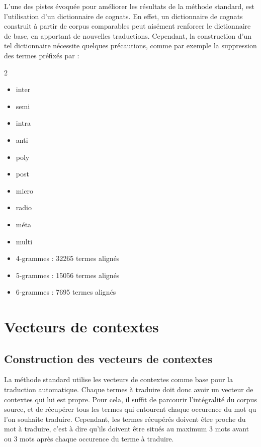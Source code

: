 	L'une des pistes évoquée pour améliorer les résultats de la méthode standard, est l'utilisation d'un dictionnaire de cognats. En effet, un dictionnaire de cognats construit à partir de corpus comparables peut aisément renforcer le dictionnaire de base, en apportant de nouvelles traductions. Cependant, la construction d'un tel dictionnaire nécessite quelques précautions, comme par exemple la suppression des termes préfixés par :
	\begin {multicols}{2}
	\begin{itemize}
		\item inter 
		\item semi 
		\item intra 
		\item anti 
		\item poly 
		\item post 
		\item micro 
		\item radio 
		\item méta 
		\item multi
	\end{itemize}
	\end {multicols}	

	\vspace{0.5cm}
	
	\begin{itemize}
		\item 4-grammes : 32265 termes alignés
		\item 5-grammes : 15056 termes alignés
		\item 6-grammes : 7695 termes alignés
	\end{itemize}
	

\section{Vecteurs de contextes}

	\subsection{Construction des vecteurs de contextes}
	La méthode standard utilise les vecteurs de contextes comme base pour la traduction automatique. Chaque termes à traduire doit donc avoir un vecteur de contextes qui lui est propre. Pour cela, il suffit de parcourir l'intégralité du corpus source, et de récupérer tous les termes qui entourent chaque occurence du mot qu l'on souhaite traduire. Cependant, les termes récupérés doivent être proche du mot à traduire, c'est à dire qu'ils doivent être situés au maximum 3 mots avant ou 3 mots après chaque occurence du terme à traduire. \\
	
